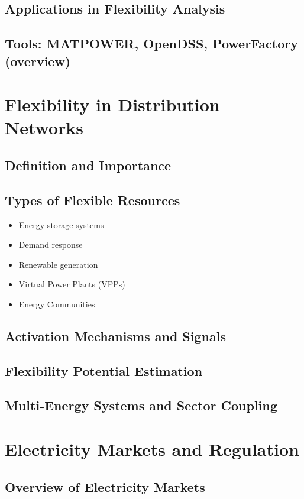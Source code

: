 \documentclass[11pt]{article}
\begin{document}
	\subsection{Applications in Flexibility Analysis}
	\subsection{Tools: MATPOWER, OpenDSS, PowerFactory (overview)}
	
	\section{Flexibility in Distribution Networks}
	\subsection{Definition and Importance}
	\subsection{Types of Flexible Resources}
	\begin{itemize}
		\item Energy storage systems
		\item Demand response
		\item Renewable generation
		\item Virtual Power Plants (VPPs)
		\item Energy Communities
	\end{itemize}
	\subsection{Activation Mechanisms and Signals}
	\subsection{Flexibility Potential Estimation}
	\subsection{Multi-Energy Systems and Sector Coupling}
	
	\section{Electricity Markets and Regulation}
	\subsection{Overview of Electricity Markets}
\end{document}
